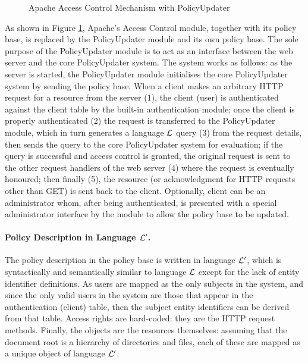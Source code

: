 \documentclass{llncs}
\begin{document}
      \begin{figure}[ht]
        \begin{center}
          \caption{Apache Access Control Mechanism with PolicyUpdater}
          \label{fig-2}
        \end{center}
      \end{figure}

      As shown in Figure \ref{fig-2}, Apache's Access Control module, together
      with its policy base, is replaced by the PolicyUpdater module and its own
      policy base. The sole purpose of the PolicyUpdater module is to act as an
      interface between the web server and the core PolicyUpdater system. The
      system works as follows: as the server is started, the PolicyUpdater
      module initialises the core PolicyUpdater system by sending the policy
      base. When a client makes an arbitrary HTTP request for a resource from
      the server (1), the client (user) is authenticated against the client
      table by the built-in authentication module; once the client is properly
      authenticated (2) the request is transferred to the PolicyUpdater module,
      which in turn generates a language ${\cal L}$ query (3) from the request
      details, then sends the query to the core PolicyUpdater system for
      evaluation; if the query is successful and access control is granted,
      the original request is sent to the other request handlers of the web
      server (4) where the request is eventually honoured; then finally (5),
      the resource (or acknowledgment for HTTP requests other than GET) is sent
      back to the client. Optionally, client can be an administrator whom,
      after being authenticated, is presented with a special administrator
      interface by the module to allow the policy base to be updated.

      \paragraph{\bf Policy Description in Language ${\cal L'}$.}

        The policy description in the policy base is written in language
        ${\cal L'}$, which is syntactically and semantically similar to
        language ${\cal L}$ except for the lack of entity identifier
        definitions. As users are mapped as the only subjects in the system,
        and since the only valid users in the system are those that appear in
        the authentication (client) table, then the subject entity identifiers
        can be derived from that table. Access rights are hard-coded: they are
        the HTTP request methods. Finally, the objects are the resources
        themselves: assuming that the document root is a hierarchy of
        directories and files, each of these are mapped as a unique object of
        language ${\cal L'}$.
\end{document}
